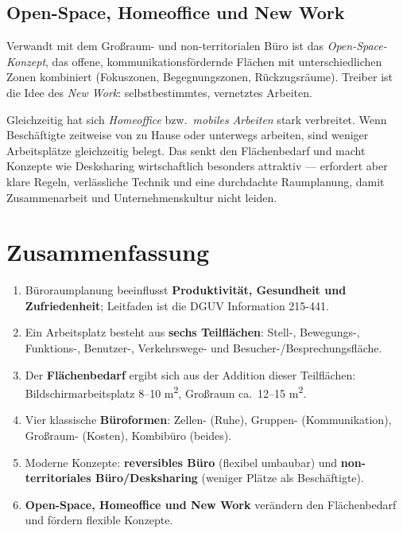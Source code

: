 \documentclass[11pt, a4paper]{article}
\begin{document}
\subsection{Open-Space, Homeoffice und New Work}

Verwandt mit dem Großraum- und non-territorialen Büro ist das \emph{Open-Space-Konzept},
das offene, kommunikationsfördernde Flächen mit unterschiedlichen Zonen kombiniert
(Fokuszonen, Begegnungszonen, Rückzugsräume). Treiber ist die Idee des \emph{New Work}:
selbstbestimmtes, vernetztes Arbeiten.

Gleichzeitig hat sich \emph{Homeoffice} bzw.\ \emph{mobiles Arbeiten} stark verbreitet.
Wenn Beschäftigte zeitweise von zu Hause oder unterwegs arbeiten, sind weniger
Arbeitsplätze gleichzeitig belegt. Das senkt den Flächenbedarf und macht Konzepte wie
Desksharing wirtschaftlich besonders attraktiv --- erfordert aber klare Regeln,
verlässliche Technik und eine durchdachte Raumplanung, damit Zusammenarbeit und
Unternehmenskultur nicht leiden.

\section{Zusammenfassung}

\begin{enumerate}
  \item Büroraumplanung beeinflusst \textbf{Produktivität, Gesundheit und Zufriedenheit}; Leitfaden ist die DGUV Information 215-441.
  \item Ein Arbeitsplatz besteht aus \textbf{sechs Teilflächen}: Stell-, Bewegungs-, Funktions-, Benutzer-, Verkehrswege- und Besucher-/Besprechungsfläche.
  \item Der \textbf{Flächenbedarf} ergibt sich aus der Addition dieser Teilflächen: Bildschirmarbeitsplatz 8--10 m\textsuperscript{2}, Großraum ca.\ 12--15 m\textsuperscript{2}.
  \item Vier klassische \textbf{Büroformen}: Zellen- (Ruhe), Gruppen- (Kommunikation), Großraum- (Kosten), Kombibüro (beides).
  \item Moderne Konzepte: \textbf{reversibles Büro} (flexibel umbaubar) und \textbf{non-territoriales Büro/Desksharing} (weniger Plätze als Beschäftigte).
  \item \textbf{Open-Space, Homeoffice und New Work} verändern den Flächenbedarf und fördern flexible Konzepte.
\end{enumerate}

\newpage
\end{document}
